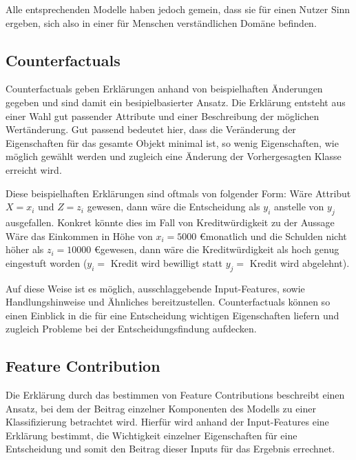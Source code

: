 Alle entsprechenden Modelle haben jedoch gemein, dass sie für einen Nutzer Sinn ergeben, sich also in einer für Menschen verständlichen Domäne befinden. \cite{MontavonLRP}


\subsection{Counterfactuals}
\label{subsection: CF}

Counterfactuals geben Erklärungen anhand von beispielhaften Änderungen gegeben und sind damit ein besipielbasierter Ansatz. \cite{InterpretableMLMolnar} Die Erklärung entsteht aus einer Wahl gut passender Attribute und einer Beschreibung der möglichen Wertänderung. Gut passend bedeutet hier, dass die Veränderung der Eigenschaften für das gesamte Objekt minimal ist, so wenig Eigenschaften, wie möglich gewählt werden und zugleich eine Änderung der Vorhergesagten Klasse erreicht wird. \cite{CangCounterfactuals}

Diese beispielhaften Erklärungen sind oftmals von folgender Form: Wäre Attribut $X=x_i$ und $Z=z_i$ gewesen, dann wäre die Entscheidung als $y_i$ anstelle von $y_j$ ausgefallen. Konkret könnte dies im Fall von Kreditwürdigkeit zu der Aussage \glqq Wäre das Einkommen in Höhe von $x_i= 5000$ \euro monatlich und die Schulden nicht höher als $z_i = 10000$ \euro gewesen, dann wäre die Kreditwürdigkeit als hoch genug eingestuft worden ($y_i = $ Kredit wird bewilligt statt $y_j = $ Kredit wird abgelehnt)\grqq. 

Auf diese Weise ist es möglich, ausschlaggebende Input-Features, sowie Handlungshinweise und Ähnliches bereitzustellen. Counterfactuals können so einen Einblick in die für eine Entscheidung wichtigen Eigenschaften liefern und zugleich Probleme bei der Entscheidungsfindung aufdecken. \cite{WachterCounterfactuals}

\subsection{Feature Contribution}
\label{subsection: Contribution}

Die Erklärung durch das bestimmen von Feature Contributions beschreibt einen Ansatz, bei dem der Beitrag einzelner Komponenten des Modells zu einer Klassifizierung betrachtet wird.  \cite{StrumbeljFeatureContribution, PalczewskaFeatureContribution} Hierfür wird anhand der Input-Features eine Erklärung bestimmt, die Wichtigkeit einzelner Eigenschaften für eine Entscheidung und somit den Beitrag dieser Inputs für das Ergebnis errechnet. \cite{} 

